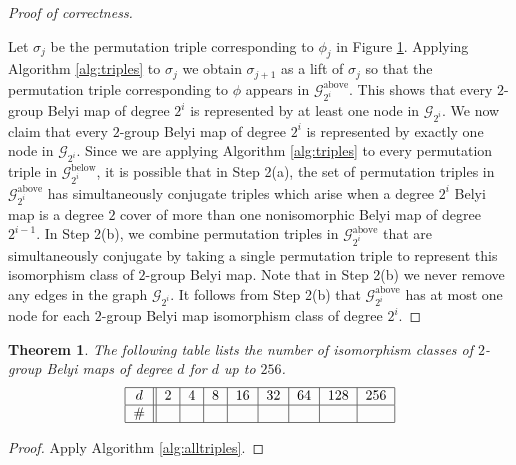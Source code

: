 \documentclass{dcthesis}
\newtheorem{theorem}[prop]{Theorem}
\theoremstyle{definition}
\theoremstyle{remark}
\numberwithin{equation}{section}
\numberwithin{figure}{section}
\begin{document}
{{\begin{proof}[Proof of correctness]
\begin{figure}[ht]
{        }
        \label{fig:2groupfiltration}
      \end{figure}
      Let $\sigma_j$ be the permutation triple corresponding to
      $\phi_j$ in Figure \ref{fig:2groupfiltration}.
      Applying Algorithm \ref{alg:triples} to $\sigma_j$
      we obtain $\sigma_{j+1}$ as a lift of $\sigma_j$
      so that the permutation triple corresponding to $\phi$
      appears in $\mathscr{G}_{2^i}^\text{above}$.
      This shows that every $2$-group Belyi map
      of degree $2^i$ is represented by at least one node in
      $\mathscr{G}_{2^i}$.
      We now claim that every $2$-group Belyi map of degree $2^i$
      is represented by exactly one node in $\mathscr{G}_{2^i}$.
      Since we are applying Algorithm \ref{alg:triples}
      to every permutation triple in $\mathscr{G}_{2^i}^\text{below}$,
      it is possible that in Step 2(a),
      the set of permutation triples in $\mathscr{G}_{2^i}^\text{above}$
      has simultaneously conjugate triples
      which arise when a degree $2^i$ Belyi map
      is a degree $2$ cover of more than one
      nonisomorphic Belyi map of degree $2^{i-1}$.
      In Step 2(b),
      we combine permutation triples in $\mathscr{G}_{2^i}^\text{above}$
      that are simultaneously conjugate by taking a single
      permutation triple to represent this isomorphism class
      of $2$-group Belyi map.
      Note that in Step 2(b)
      we never remove any edges in the graph
      $\mathscr{G}_{2^i}$.
      It follows from Step 2(b)
      that $\mathscr{G}_{2^i}^\text{above}$ has at most
      one node for each
      $2$-group Belyi map
      isomorphism class of degree $2^i$.
    \end{proof}
    \begin{theorem}\label{thm:isoclasses}
      The following table lists the number of isomorphism classes of
      $2$-group Belyi maps of degree $d$ for $d$ up to $256$.
      \[
        \begin{tabular}{|c||c|c|c|c|c|c|c|c|}
          \hline
          $d$ & $2$ & $4$ & $8$ & $16$ & $32$ & $64$ & $128$ & $256$\\
          \hline
          \# & $$ & $$ & $$ & $$ & $$ & $$ & $$ & $$\\
          \hline
        \end{tabular}
      \]
    \end{theorem}
    \begin{proof}
      Apply Algorithm \ref{alg:alltriples}.
    \end{proof}
}}
\end{document}

